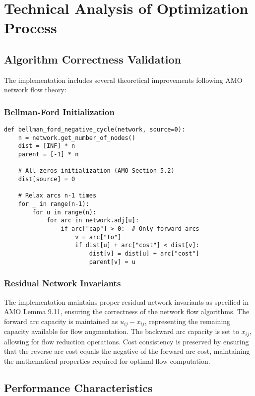 \documentclass[12pt,a4paper]{article}
\begin{document}
\section{Technical Analysis of Optimization Process}

\subsection{Algorithm Correctness Validation}

The implementation includes several theoretical improvements following AMO network flow theory:

\subsubsection{Bellman-Ford Initialization}
\begin{lstlisting}[caption=Proper Bellman-Ford Implementation]
def bellman_ford_negative_cycle(network, source=0):
    n = network.get_number_of_nodes()
    dist = [INF] * n
    parent = [-1] * n
    
    # All-zeros initialization (AMO Section 5.2)
    dist[source] = 0
    
    # Relax arcs n-1 times
    for _ in range(n-1):
        for u in range(n):
            for arc in network.adj[u]:
                if arc["cap"] > 0:  # Only forward arcs
                    v = arc["to"]
                    if dist[u] + arc["cost"] < dist[v]:
                        dist[v] = dist[u] + arc["cost"]
                        parent[v] = u
\end{lstlisting}

\subsubsection{Residual Network Invariants}

The implementation maintains proper residual network invariants as specified in AMO Lemma 9.11, ensuring the correctness of the network flow algorithms. The forward arc capacity is maintained as $u_{ij} - x_{ij}$, representing the remaining capacity available for flow augmentation. The backward arc capacity is set to $x_{ij}$, allowing for flow reduction operations. Cost consistency is preserved by ensuring that the reverse arc cost equals the negative of the forward arc cost, maintaining the mathematical properties required for optimal flow computation.

\subsection{Performance Characteristics}
\end{document}
